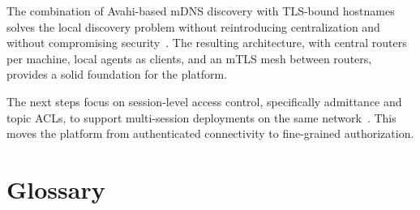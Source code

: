 \documentclass[11pt,a4paper]{article}
\begin{document}
The combination of Avahi-based mDNS discovery with TLS-bound
hostnames solves the local discovery problem without reintroducing
centralization and without compromising
security~\citep{rfc6762,avahi}. The resulting architecture, with
central routers per machine, local agents as clients, and an mTLS
mesh between routers, provides a solid foundation for the platform.

The next steps focus on session-level access control, specifically
admittance and topic ACLs, to support multi-session deployments on
the same network~\citep{zenoh-acl}. This moves the platform from
authenticated connectivity to fine-grained authorization.

\section*{Glossary}
\end{document}
